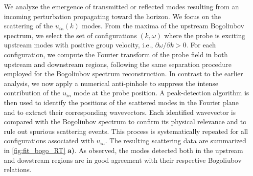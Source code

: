 We analyze the emergence of transmitted or reflected modes resulting from an incoming perturbation propagating toward the horizon. 
We focus on the scattering of the \( u_{in}(k) \) modes. 
From the maxima of the upstream Bogoliubov spectrum, we select the set of configurations \((k, \omega)\) where the probe is exciting upstream modes with positive group velocity, i.e., \(\partial\omega/\partial k > 0\). 
For each configuration, we compute the Fourier transform of the probe field in both upstream and downstream regions, following the same separation procedure employed for the Bogoliubov spectrum reconstruction. 
In contrast to the earlier analysis, we now apply a numerical anti-pinhole to suppress the intense contribution of the \( u_{in} \) mode at the probe position. A peak-detection algorithm is then used to identify the positions of the scattered modes in the Fourier plane and to extract their corresponding wavevectors.
Each identified wavevector is compared with the Bogoliubov spectrum to confirm its physical relevance and to rule out spurious scattering events. This process is systematically repeated for all configurations associated with \( u_{in} \). The resulting scattering data are summarized in \autoref{fig:fit_bogo_RT} \textbf{a)}. As observed, the modes detected both in the upstream and dowstream regions 
are in good agreement with their respective Bogoliubov relations.

